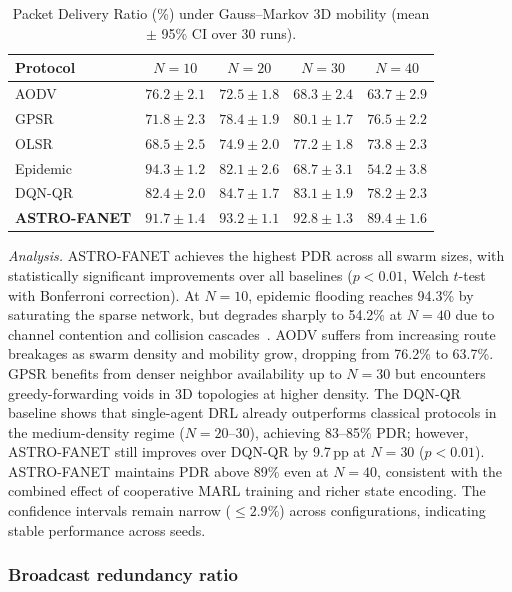 \documentclass[5p,times]{elsarticle}
\begin{document}
\begin{table}[t]
\centering
\caption{Packet Delivery Ratio (\%) under Gauss--Markov 3D mobility (mean $\pm$ 95\% CI over 30 runs).}
\label{tab:pdr_results}
\scriptsize
\begin{tabular}{lcccc}
\toprule
Protocol & $N=10$ & $N=20$ & $N=30$ & $N=40$ \\
\midrule
AODV & $76.2 \pm 2.1$ & $72.5 \pm 1.8$ & $68.3 \pm 2.4$ & $63.7 \pm 2.9$ \\
GPSR & $71.8 \pm 2.3$ & $78.4 \pm 1.9$ & $80.1 \pm 1.7$ & $76.5 \pm 2.2$ \\
OLSR & $68.5 \pm 2.5$ & $74.9 \pm 2.0$ & $77.2 \pm 1.8$ & $73.8 \pm 2.3$ \\
Epidemic & $94.3 \pm 1.2$ & $82.1 \pm 2.6$ & $68.7 \pm 3.1$ & $54.2 \pm 3.8$ \\
DQN-QR & $82.4 \pm 2.0$ & $84.7 \pm 1.7$ & $83.1 \pm 1.9$ & $78.2 \pm 2.3$ \\
\textbf{ASTRO-FANET} & $\mathbf{91.7 \pm 1.4}$ & $\mathbf{93.2 \pm 1.1}$ & $\mathbf{92.8 \pm 1.3}$ & $\mathbf{89.4 \pm 1.6}$ \\
\bottomrule
\end{tabular}
\end{table}

\textit{Analysis.} ASTRO-FANET achieves the highest PDR across all swarm sizes, with statistically significant improvements over all baselines ($p < 0.01$, Welch $t$-test with Bonferroni correction). At $N=10$, epidemic flooding reaches 94.3\% by saturating the sparse network, but degrades sharply to 54.2\% at $N=40$ due to channel contention and collision cascades~\cite{tseng2002broadcast}. AODV suffers from increasing route breakages as swarm density and mobility grow, dropping from 76.2\% to 63.7\%. GPSR benefits from denser neighbor availability up to $N=30$ but encounters greedy-forwarding voids in 3D topologies at higher density. The DQN-QR baseline shows that single-agent DRL already outperforms classical protocols in the medium-density regime ($N=20$--$30$), achieving 83--85\% PDR; however, ASTRO-FANET still improves over DQN-QR by 9.7\,pp at $N=30$ ($p < 0.01$). ASTRO-FANET maintains PDR above 89\% even at $N=40$, consistent with the combined effect of cooperative MARL training and richer state encoding. The confidence intervals remain narrow ($\leq 2.9\%$) across configurations, indicating stable performance across seeds.

\subsubsection{Broadcast redundancy ratio}
\end{document}
